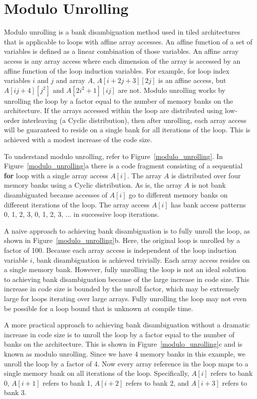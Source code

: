 \section{Modulo Unrolling}\label{sec:modulo_unrolling}

Modulo unrolling \cite{barua1999maps} is a bank disambiguation method used in tiled architectures that is applicable to loops with affine array accesses. An affine function of a set of variables is defined as a linear combination of those variables. An affine array access is any array access where each dimension of the array is accessed by an affine function of the loop induction variables. For example, for loop index variables $i$ and $j$ and array $A$, $A[i+2j+3][2j]$ is an affine access, but $A[ij+4][j^2]$ and $A[2i^2+1][ij]$ are not. Modulo unrolling works by unrolling the loop by a factor equal to the number of memory banks on the architecture. If the arrays accessed within the loop are distributed using low-order interleaving (a Cyclic distribution), then after unrolling, each array access will be guaranteed to reside on a single bank for all iterations of the loop. This is achieved with a modest increase of the code size. 

To understand modulo unrolling, refer to Figure~\ref{modulo_unrolling}. In Figure~\ref{modulo_unrolling}a there is a code fragment consisting of a sequential \textbf{for} loop with a single array access $A[i]$. The array $A$ is distributed over four memory banks using a Cyclic distribution. As is, the array $A$ is not bank disambiguated because accesses of $A[i]$ go to different memory banks on different iterations of the loop. The array access $A[i]$ has bank access patterns 0, 1, 2, 3, 0, 1, 2, 3, ... in successive loop iterations. 

A naive approach to achieving bank disambiguation is to fully unroll the loop, as shown in Figure~\ref{modulo_unrolling}b. Here, the original loop is unrolled by a factor of 100. Because each array access is independent of the loop induction variable $i$, bank disambiguation is achieved trivially. Each array access resides on a single memory bank. However, fully unrolling the loop is not an ideal solution to achieving bank disambiguation because of the large increase in code size. This increase in code size is bounded by the unroll factor, which may be extremely large for loops iterating over large arrays. Fully unrolling the loop may not even be possible for a loop bound that is unknown at compile time. 

A more practical approach to achieving bank disambiguation without a dramatic increase in code size is to unroll the loop by a factor equal to the number of banks on the architecture. This is shown in Figure~\ref{modulo_unrolling}c and is known as modulo unrolling. Since we have 4 memory banks in this example, we unroll the loop by a factor of 4. Now every array reference in the loop maps to a single memory bank on all iterations of the loop. Specifically, $A[i]$ refers to bank 0, $A[i+1]$ refers to bank 1, $A[i+2]$ refers to bank 2, and $A[i+3]$ refers to bank 3.

